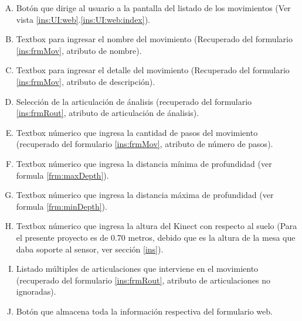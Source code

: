 \begin{enumerate}[A.]
\item Bot\'on que dirige al usuario a la pantalla del listado de los movimientos (Ver vista \ref{ins:UI:web}.\ref{ins:UI:web:index}).
\item Textbox para ingresar el nombre del movimiento (Recuperado del formulario \ref{ins:frmMov}, atributo de nombre).
\item Textbox para ingresar el detalle del movimiento (Recuperado del formulario \ref{ins:frmMov}, atributo de descripci\'on).
\item Selecci\'on de la articulaci\'on de \'analisis (recuperado del formulario  \ref{ins:frmRout}, atributo de articulaci\'on de \'analisis).
\item Textbox n\'umerico que ingresa la cantidad de pasos del movimiento (recuperado del formulario  \ref{ins:frmMov}, atributo de n\'umero de pasos).
\item Textbox n\'umerico que ingresa la distancia m\'inima de profundidad (ver formula \ref{frm:maxDepth}).
\item Textbox n\'umerico que ingresa la distancia m\'axima de profundidad (ver formula \ref{frm:minDepth}).
\item Textbox n\'umerico que ingresa la altura del Kinect con respecto al suelo (Para el presente proyecto es de 0.70 metros, debido que es la altura de la mesa que daba soporte al sensor, ver secci\'on \ref{ins}).
\item Listado m\'ultiples de articulaciones que interviene en el movimiento (recuperado del formulario  \ref{ins:frmRout}, atributo de articulaciones no ignoradas).
\item Bot\'on que almacena toda la informaci\'on respectiva del formulario web.
\end{enumerate}
